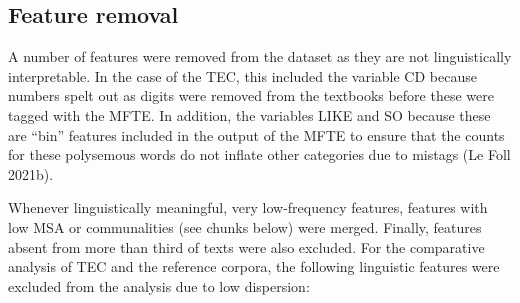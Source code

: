 \documentclass[
  letterpaper,
  DIV=11,
  numbers=noendperiod]{scrreprt}
\begin{document}
\subsection{Feature removal}\label{feature-removal-1}

A number of features were removed from the dataset as they are not
linguistically interpretable. In the case of the TEC, this included the
variable CD because numbers spelt out as digits were removed from the
textbooks before these were tagged with the MFTE. In addition, the
variables LIKE and SO because these are ``bin'' features included in the
output of the MFTE to ensure that the counts for these polysemous words
do not inflate other categories due to mistags (Le Foll 2021b).

Whenever linguistically meaningful, very low-frequency features,
features with low MSA or communalities (see chunks below) were merged.
Finally, features absent from more than third of texts were also
excluded. For the comparative analysis of TEC and the reference corpora,
the following linguistic features were excluded from the analysis due to
low dispersion:
\end{document}
